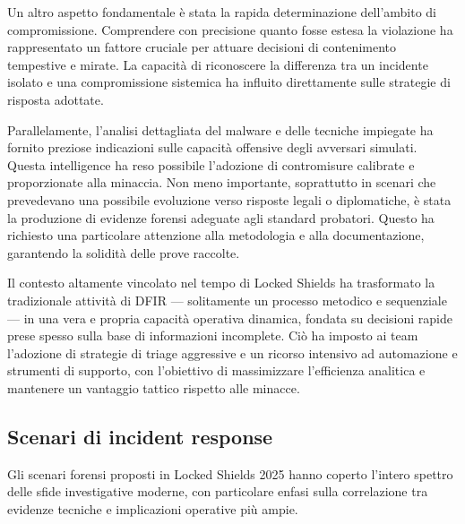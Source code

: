 Un altro aspetto fondamentale è stata la rapida determinazione dell’ambito di compromissione. Comprendere con precisione quanto fosse estesa la violazione ha rappresentato un fattore cruciale per attuare decisioni di contenimento tempestive e mirate. La capacità di riconoscere la differenza tra un incidente isolato e una compromissione sistemica ha influito direttamente sulle strategie di risposta adottate.

Parallelamente, l’analisi dettagliata del malware e delle tecniche impiegate ha fornito preziose indicazioni sulle capacità offensive degli avversari simulati. Questa intelligence ha reso possibile l’adozione di contromisure calibrate e proporzionate alla minaccia. Non meno importante, soprattutto in scenari che prevedevano una possibile evoluzione verso risposte legali o diplomatiche, è stata la produzione di evidenze forensi adeguate agli standard probatori. Questo ha richiesto una particolare attenzione alla metodologia e alla documentazione, garantendo la solidità delle prove raccolte.

Il contesto altamente vincolato nel tempo di Locked Shields ha trasformato la tradizionale attività di DFIR — solitamente un processo metodico e sequenziale — in una vera e propria capacità operativa dinamica, fondata su decisioni rapide prese spesso sulla base di informazioni incomplete. Ciò ha imposto ai team l’adozione di strategie di triage aggressive e un ricorso intensivo ad automazione e strumenti di supporto, con l’obiettivo di massimizzare l’efficienza analitica e mantenere un vantaggio tattico rispetto alle minacce.


\subsection{Scenari di incident response}

Gli scenari forensi proposti in Locked Shields 2025 hanno coperto l'intero spettro delle sfide investigative moderne, con particolare enfasi sulla correlazione tra evidenze tecniche e implicazioni operative più ampie.

